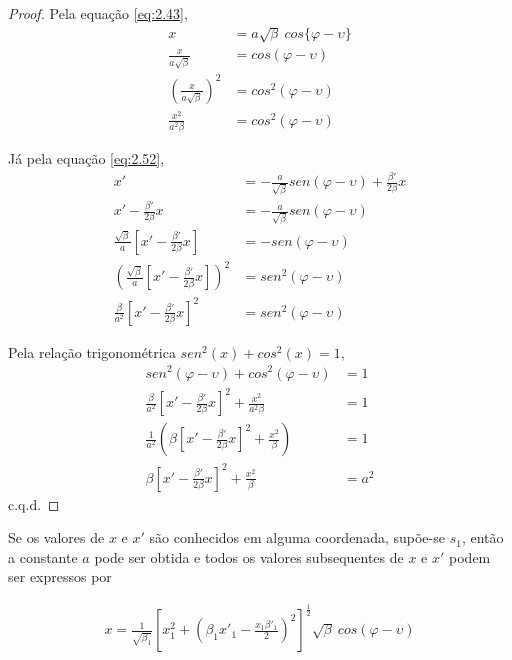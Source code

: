 \begin{proof}
	Pela equação \eqref{eq:2.43},
	\begin{align*}
        x &= a\sqrt{\beta}\ cos\{\varphi-\upsilon\}\\
        \frac{x}{a\sqrt{\beta}} &= cos(\varphi-\upsilon)\\
        \left(\frac{x}{a\sqrt{\beta}}\right)^2 &= cos^2(\varphi-\upsilon)\\
        \frac{x^2}{a^2\beta} &= cos^2(\varphi-\upsilon)
	\end{align*}
	
	Já pela equação \eqref{eq:2.52},
	\begin{align*}
        x' &= - \frac{a}{\sqrt{\beta}}sen(\varphi-\upsilon)+\frac{\beta'}{2\beta}x\\
        x' - \frac{\beta'}{2\beta}x&= - \frac{a}{\sqrt{\beta}}sen(\varphi-\upsilon)\\
        \frac{\sqrt{\beta}}{a}\left[x' - \frac{\beta'}{2\beta}x\right]&= -sen(\varphi-\upsilon)\\
        \left(\frac{\sqrt{\beta}}{a}\left[x' - \frac{\beta'}{2\beta}x\right]\right)^2&= sen^2(\varphi-\upsilon)\\
        \frac{\beta}{a^2}\left[x' - \frac{\beta'}{2\beta}x\right]^2&= sen^2(\varphi-\upsilon)
	\end{align*}
	
	Pela relação trigonométrica $sen^2(x)+cos^2(x)=1$,
	\begin{align*}
        sen^2(\varphi-\upsilon)+cos^2(\varphi-\upsilon)&=1\\
        \frac{\beta}{a^2}\left[x' - \frac{\beta'}{2\beta}x\right]^2 + \frac{x^2}{a^2\beta} &= 1\\
        \frac{1}{a^2}\left(\beta\left[x' - \frac{\beta'}{2\beta}x\right]^2 + \frac{x^2}{\beta}\right) &= 1\\
        \beta\left[x' - \frac{\beta'}{2\beta}x\right]^2 + \frac{x^2}{\beta} &= a^2
	\end{align*}
	c.q.d.
\end{proof}
	
Se os valores de $x$ e $x'$ são conhecidos em alguma coordenada, supõe-se $s_1$, então a constante $a$ pode ser obtida e todos os valores subsequentes de $x$ e $x'$ podem ser expressos por
	
\begin{align}
	x = \frac{1}{\sqrt{\beta_1}}\left[x_1^2+\left(\beta_1x'_1-\frac{x_1\beta'_1}{2}\right)^2\right]^\frac{1}{2}\sqrt{\beta}\ cos(\varphi-\upsilon)\label{eq:2.57}
\end{align}
	
